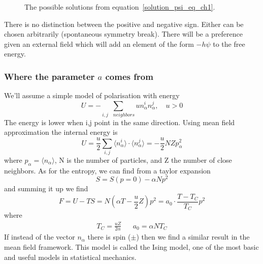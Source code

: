 \begin{figure}[!htb]
	\centering
	\caption{The possible solutions from equation~\ref{solution_psi_eq_ch1}.}
\end{figure}
There is no distinction between the positive and negative sign. Either can be chosen arbitrarily (spontaneous symmetry break). There will be a preference given an external field which will add an element of the form \(-h\psi \) to the free energy.
\newpage
\subsubsection{Where the parameter \(a\) comes from}
We'll assume a simple model of polarisation with energy 
\begin{equation}
	U=-\sum\limits_{i,j \quad neighbors}u n_\alpha^i n_\alpha^j,\quad u>0
\end{equation}
The energy is lower when i,j point in the same direction. Using mean field approximation the internal energy is
\begin{equation}
	U=\frac{u}{2}\sum\limits_{i,j}\langle n_\alpha^i\rangle\cdot\langle n_\alpha^j\rangle = -\frac{u}{2}NZp_\alpha^2
\end{equation}
where \(p_\alpha=\langle n_\alpha\rangle \), N is the number of particles, and Z the number of close neighbors. As for the entropy, we can find from a taylor expansion
\begin{equation}
	S=S(p=0)-\alpha Np^2
\end{equation}
and summing it up we find
\begin{equation}
	F=U-TS=N\left(\alpha T-\frac{u}{2}Z\right)p^2=a_0\cdot\frac{T-T_C}{T_C}p^2
\end{equation}
where 
\begin{align}
	T_C=\frac{uZ}{2\alpha} && a_0=\alpha NT_C
\end{align}
If instead of the vector \(n_\alpha \) there is spin (\(\pm \)) then we find a similar result in the mean field framework. This model is called the Ising model, one of the most basic and useful models in statistical mechanics.
